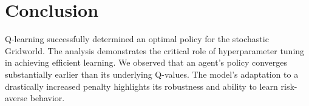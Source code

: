 \documentclass{article}
\begin{document}
\section{Conclusion}
Q-learning successfully determined an optimal policy for the stochastic Gridworld. The analysis demonstrates the critical role of hyperparameter tuning in achieving efficient learning. We observed that an agent's policy converges substantially earlier than its underlying Q-values. The model's adaptation to a drastically increased penalty highlights its robustness and ability to learn risk-averse behavior.
\end{document}
